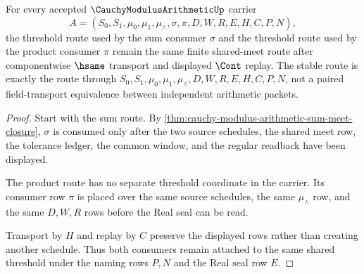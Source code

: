 \begin{theorem}
\label{thm:cauchymodulusarithmetic-sum-product-threshold-stability}
For every accepted $\CauchyModulusArithmeticUp$ carrier
$$
A=(S_0,S_1,\mu_0,\mu_1,\mu_{\wedge},\sigma,\pi,D,W,R,E,H,C,P,N),
$$
the threshold route used by the sum consumer $\sigma$ and the threshold route
used by the product consumer $\pi$ remain the same finite shared-meet route after
componentwise $\hsame$ transport and displayed $\Cont$ replay. The stable route
is exactly the route through $S_0,S_1,\mu_0,\mu_1,\mu_{\wedge},D,W,R,E,H,C,P,N$,
not a paired field-transport equivalence between independent arithmetic
packets.
\end{theorem}
\begin{proof}
Start with the sum route. By
\autoref{thm:cauchy-modulus-arithmetic-sum-meet-closure}, $\sigma$ is consumed
only after the two source schedules, the shared meet row, the tolerance ledger,
the common window, and the regular readback have been displayed.

The product route has no separate threshold coordinate in the carrier. Its
consumer row $\pi$ is placed over the same source schedules, the same
$\mu_{\wedge}$ row, and the same $D,W,R$ rows before the Real seal can be read.

Transport by $H$ and replay by $C$ preserve the displayed rows rather than
creating another schedule. Thus both consumers remain attached to the same
shared threshold under the naming rows $P,N$ and the Real seal row $E$.
\end{proof}

